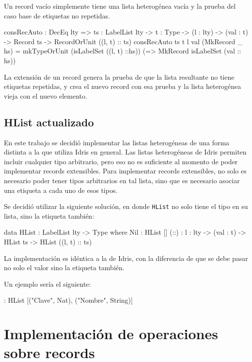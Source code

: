 Un record vacío simplemente tiene una lista heterogénea vacía y la prueba del caso base de etiquetas no repetidas.

\begin{code}
consRecAuto : DecEq lty => {ts : LabelList lty} ->
  {t : Type} -> (l : lty) -> (val : t) -> Record ts ->
  RecordOrUnit ((l, t) :: ts)
consRecAuto {ts} {t} l val (MkRecord _ hs) =
  mkTypeOrUnit (isLabelSet ((l, t) ::hs))
  (\isLabelSet => MkRecord isLabelSet (val :: hs))
\end{code}

La extensión de un record genera la prueba de que la lista resultante no tiene etiquetas repetidas, y crea el nuevo record con esa prueba y la lista heterogénea vieja con el nuevo elemento.

\subsection{HList actualizado}

En este trabajo se decidió implementar las listas heterogéneas de una forma distinta a la que utiliza Idris en general. Las listas heterogéneas de Idris permiten incluir cualquier tipo arbitrario, pero eso no es suficiente al momento de poder implementar records extensibles. Para implementar records extensibles, no solo es necesario poder tener tipos arbitrarios en tal lista, sino que es necesario asociar una etiqueta a cada uno de esos tipos.

Se decidió utilizar la siguiente solución, en donde \texttt{HList} no solo tiene el tipo en su lista, sino la etiqueta también:

\begin{code}
data HList : LabelList lty -> Type where
  Nil : HList []
  (::) : {l : lty} -> (val : t) -> HList ts ->
    HList ((l, t) :: ts)
\end{code}

La implementación es idéntica a la de Idris, con la diferencia de que se debe pasar no solo el valor sino la etiqueta también.

Un ejemplo sería el siguiente:

\begin{code}
 :
  HList [("Clave", Nat), ("Nombre", String)]
\end{code}

\section{Implementación de operaciones sobre records}


